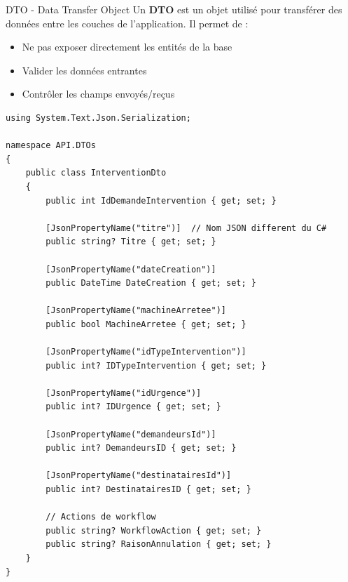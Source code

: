 \documentclass[12pt,a4paper]{article}
\begin{document}
\begin{defbox}{DTO - Data Transfer Object}
Un \textbf{DTO} est un objet utilisé pour transférer des données entre les couches de l'application. Il permet de :
\begin{itemize}
    \item Ne pas exposer directement les entités de la base
    \item Valider les données entrantes
    \item Contrôler les champs envoyés/reçus
\end{itemize}
\end{defbox}

\begin{lstlisting}[language=CSharp, caption=API/DTOs/InterventionDto.cs]
using System.Text.Json.Serialization;

namespace API.DTOs
{
    public class InterventionDto
    {
        public int IdDemandeIntervention { get; set; }
        
        [JsonPropertyName("titre")]  // Nom JSON different du C#
        public string? Titre { get; set; }
        
        [JsonPropertyName("dateCreation")]
        public DateTime DateCreation { get; set; }
        
        [JsonPropertyName("machineArretee")]
        public bool MachineArretee { get; set; }
        
        [JsonPropertyName("idTypeIntervention")]
        public int? IDTypeIntervention { get; set; }
        
        [JsonPropertyName("idUrgence")]
        public int? IDUrgence { get; set; }
        
        [JsonPropertyName("demandeursId")]
        public int? DemandeursID { get; set; }
        
        [JsonPropertyName("destinatairesId")]
        public int? DestinatairesID { get; set; }
        
        // Actions de workflow
        public string? WorkflowAction { get; set; }
        public string? RaisonAnnulation { get; set; }
    }
}
\end{lstlisting}
\end{document}
